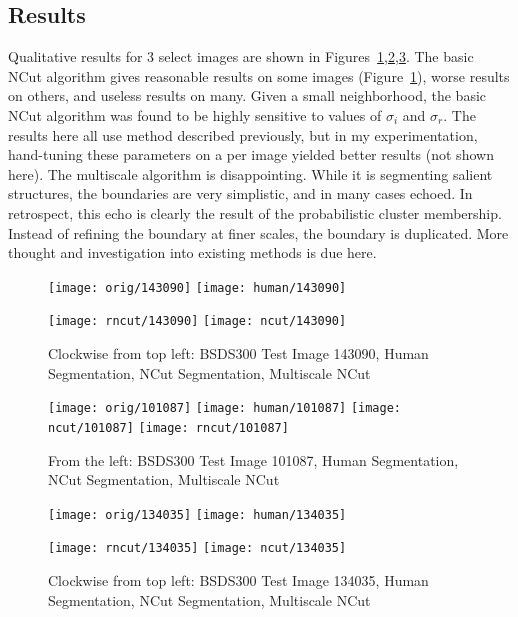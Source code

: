 \documentclass{article}
\begin{document}
\subsection{Results}
Qualitative results for 3 select images are shown in Figures~\ref{fig:res1},\ref{fig:res2},\ref{fig:res3}.  The 
basic NCut algorithm gives reasonable results on some images (Figure~\ref{fig:res1}), worse results on others,
and useless results on many.  Given a small neighborhood, the basic NCut algorithm was found to be highly sensitive
to values of $\sigma_i$ and $\sigma_r$.  The results here all use method described previously, but in my experimentation, hand-tuning these parameters on a per image yielded better results (not shown here).  The multiscale algorithm is disappointing.  While it is segmenting salient structures, the boundaries are very simplistic, and in 
many cases echoed.  In retrospect, this echo is clearly the result of the probabilistic cluster membership.  Instead of refining the boundary at finer scales, the boundary is duplicated.  More thought and investigation into existing methods is due here. 
\begin{figure}
	 \centerline{
	    \mbox{\texttt{[image: orig/143090]}}
		\mbox{\texttt{[image: human/143090]}}
	}
	\centerline{
		\mbox{\texttt{[image: rncut/143090]}}
		\mbox{\texttt{[image: ncut/143090]}}
	}
	\caption{Clockwise from top left: BSDS300 Test Image 143090, Human Segmentation, NCut Segmentation, Multiscale NCut}
	\label{fig:res1}
\end{figure}
\begin{figure}
	 \centerline{
	    \mbox{\texttt{[image: orig/101087]}}
		\mbox{\texttt{[image: human/101087]}}
		\mbox{\texttt{[image: ncut/101087]}}
		\mbox{\texttt{[image: rncut/101087]}}
	}
	\caption{From the left: BSDS300 Test Image 101087, Human Segmentation, NCut Segmentation, Multiscale NCut}
	\label{fig:res2}
\end{figure}
\begin{figure}
	 \centerline{
	    \mbox{\texttt{[image: orig/134035]}}
		\mbox{\texttt{[image: human/134035]}}
	}
	\centerline{
		\mbox{\texttt{[image: rncut/134035]}}
		\mbox{\texttt{[image: ncut/134035]}}
	}
	\caption{Clockwise from top left: BSDS300 Test Image 134035, Human Segmentation, NCut Segmentation, Multiscale NCut}
	\label{fig:res3}
\end{figure}

\end{document}
